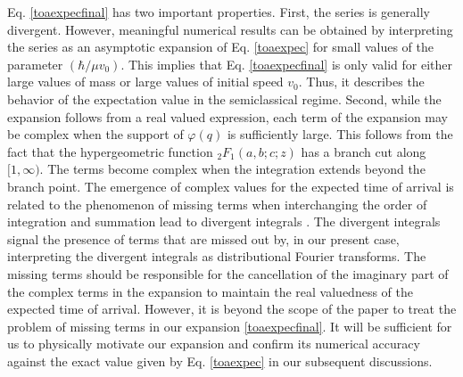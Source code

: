 \documentclass[%
 reprint,
 amsmath,amssymb,
 aps,
]{revtex4-1}
\begin{document}
Eq. \eqref{toaexpecfinal} has two important properties. First, the series is generally divergent. However, meaningful numerical results can be obtained by interpreting the series as an asymptotic expansion of Eq. \eqref{toaexpec} for small values of the parameter $(\hbar/\mu v_0)$. This implies that Eq. \eqref{toaexpecfinal} is only valid for either large values of mass or large values of initial speed $v_0$. Thus, it describes the behavior of the expectation value in the semiclassical regime. Second, while the expansion follows from a real valued expression, each term of the expansion may be complex when the support of $\varphi(q)$ is sufficiently large. This follows from the fact that the hypergeometric function $ _2F_1(a,b;c;z)$ has a branch cut along $[1,\infty)$. The terms become complex when the integration extends beyond the branch point. The emergence of complex values for the expected time of arrival is related to the phenomenon of missing terms when interchanging the order of integration and summation lead to divergent integrals \cite{wongBook,wongPAMS1980,galaponPRSA2017, tica2019, tica2018}. The divergent integrals signal the presence of terms that are missed out by, in our present case, interpreting the divergent integrals as distributional Fourier transforms. The missing terms should be responsible for the cancellation of the imaginary part of the complex terms in the expansion to maintain the real valuedness of the expected time of arrival. However, it is beyond the scope of the paper to treat the problem of missing terms in our expansion \eqref{toaexpecfinal}. It will be sufficient for us to physically motivate our expansion and confirm its numerical accuracy against the exact value given by Eq. \eqref{toaexpec} in our subsequent discussions. 
\end{document}
